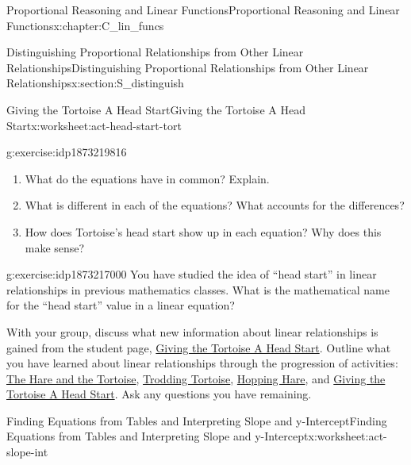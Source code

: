 \documentclass[oneside,10pt,]{book}
\numberwithin{equation}{chapter}
\begin{document}
\begin{chapterptx}{Proportional Reasoning and Linear Functions}{}{Proportional Reasoning and Linear Functions}{}{}{x:chapter:C_lin_funcs}
\begin{sectionptx}{Distinguishing Proportional Relationships from Other Linear Relationships}{}{Distinguishing Proportional Relationships from Other Linear Relationships}{}{}{x:section:S_distinguish}
\begin{worksheet-subsection}{Giving the Tortoise A Head Start}{}{Giving the Tortoise A Head Start}{}{}{x:worksheet:act-head-start-tort}
\begin{divisionexercise}{4}{}{}{g:exercise:idp1873219816}
\begin{enumerate}[font=\bfseries,label=(\alph*),ref=\alph*]
\item{}What do the equations have in common? Explain.%
\item{}What is different in each of the equations? What accounts for the differences?%
\item{}How does Tortoise's head start show up in each equation? Why does this make sense?%
\end{enumerate}
\end{divisionexercise}%
\begin{divisionexercise}{5}{}{}{g:exercise:idp1873217000}%
You have studied the idea of ``head start'' in linear relationships in previous mathematics classes. What is the mathematical name for the “head start” value in a linear equation?%
\end{divisionexercise}%
\begin{conclusion}{}%
With your group, discuss what new information about linear relationships is gained from the student page, \hyperref[x:worksheet:act-head-start-tort]{Giving the Tortoise A Head Start}. Outline what you have learned about linear relationships through the progression of activities: \hyperref[x:worksheet:act-hare-tort]{The Hare and the Tortoise}, \hyperref[x:worksheet:act-trod-tort]{Trodding Tortoise}, \hyperref[x:worksheet:act-hop-hare]{Hopping Hare}, and \hyperref[x:worksheet:act-head-start-tort]{Giving the Tortoise A Head Start}. Ask any questions you have remaining.%
\end{conclusion}%
\end{worksheet-subsection}
\restoregeometry
%
%
\typeout{************************************************}
\typeout{************************************************}
%
\begin{worksheet-subsection}{Finding Equations from Tables and Interpreting Slope and y-Intercept}{}{Finding Equations from Tables and Interpreting Slope and y-Intercept}{}{}{x:worksheet:act-slope-int}
\begin{introduction}{}%

\end{introduction}
\end{worksheet-subsection}
\end{sectionptx}
\end{chapterptx}
\end{document}
